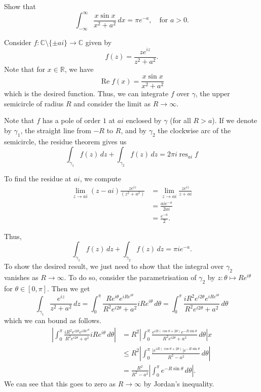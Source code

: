 \documentclass[12 pt, letterpaper]{hmcpset}
\begin{document}
\begin{problem}[4.]
	Show that
	\[
		\int_{-\infty}^{\infty} \frac{x \sin{x}}{x^{2} + a^{2}} \, dx = \pi e^{-a}, \quad \text{for } a > 0.
	\]
\end{problem}

\begin{solution}
	Consider $f : \mathbb{C} \setminus \{ \pm ai \} \to \mathbb{C}$ given by
	\[
		f(z) = \frac{z e^{iz}}{z^{2} + a^{2}}.
	\]
	Note that for $x \in \mathbb{R}$, we have
	\[
		\operatorname{Re} f(x) = \frac{x \sin{x}}{x^{2} + a^{2}}
	\]
	which is the desired function. Thus, we can integrate $f$ over $\gamma$, the upper semicircle of radius $R$ and consider the limit as $R \to \infty$.

	Note that $f$ has a pole of order $1$ at $ai$ enclosed by $\gamma$ (for all $R > a$). If we denote by $\gamma_{1}$, the straight line from $-R$ to $R$, and by $\gamma_{2}$ the clockwise arc of the semicircle, the residue theorem gives us
	\[
		\int_{\gamma_{1}} f(z) \, dz + \int_{\gamma_{2}} f(z) \, dz = 2 \pi i \operatorname{res}_{ai} f
	\]

	To find the residue at $ai$, we compute
	\[
		\begin{split}
			\lim_{z \to ai} (z - ai) \frac{z e^{iz}}{(z^{2} + a^{2})} & = \lim_{z \to ai} \frac{z e^{iz}}{z + ai} \\
										& = \frac{ai e^{-a}}{2 a i} \\
										& = \frac{e^{-a}}{2}.
		\end{split}
	\]

	Thus,
	\[
		\int_{\gamma_{1}} f(z) \, dz + \int_{\gamma_{2}} f(z) \, dz = \pi i e^{-a}.
	\]
	To show the desired result, we just need to show that the integral over $\gamma_{2}$ vanishes as $R \to \infty$. To do so, consider the parametrisation of $\gamma_{2}$ by $z : \theta \mapsto R e^{i \theta}$ for $\theta \in [0, \pi]$. Then we get
	\[
		\int_{\gamma_{1}} \frac{e^{iz}}{z^{2} + a^{2}} \, dz = \int_{0}^{\pi} \frac{Re^{i\theta} e^{i R e^{i \theta}}}{R^{2} e^{i 2 \theta} + a^{2}} i R e^{i \theta} \, d \theta = \int_{0}^{\pi} \frac{i R^{2} e^{i 2 \theta} e^{i R e^{i \theta}}}{R^{2} e^{i 2 \theta} + a^{2}} \, d\theta
	\]
	which we can bound as follows.
	\[
		\begin{split}
			\left \lvert \int_{0}^{\pi} \frac{i R^{2} e^{i 2 \theta} e^{i R e^{i \theta}}}{R^{2} e^{i 2 \theta} + a^{2}} i Re^{i \theta} \, d\theta \right \rvert & = R^{2} \left \lvert \int_{0}^{\pi} \frac{e^{i R (\cos{\theta} + 2 \theta)} e^{- R \sin{\theta}}}{R^{2} e^{i 2 \theta} + a^{2}} \, d\theta \right \rvert x \\
																		   & \le R^{2} \left \lvert \int_{0}^{\pi} \frac{\lvert e^{i R (\cos{ \theta} + 2 \theta)} \rvert e^{-R \sin{\theta}}}{R^{2} - a^{2}} \, d \theta \right \rvert \\
																		   & = \frac{R^{2}}{R^{2} - a^{2}} \left \lvert \int_{0}^{\pi} e^{-R \sin{\theta}} \, d\theta \right \rvert.
		\end{split}
	\]
	We can see that this goes to zero as $R \to \infty$ by Jordan's inequality.


\end{solution}
\end{document}

